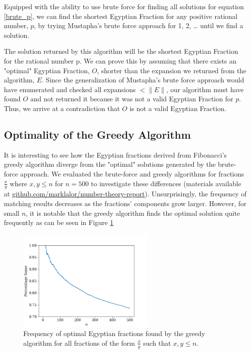 \documentclass[paper=a4, fontsize=11pt]{scrartcl}
\numberwithin{equation}{section}	 %
\numberwithin{figure}{section}	 %
\numberwithin{table}{section}	 %
\begin{document}
Equipped with the ability to use brute force for finding all solutions for equation \ref{brute_p}, we can find the shortest Egyptian Fraction for any positive rational number, $p$, by trying Mustapha’s brute force approach for 1, 2, … until we find a solution.

The solution returned by this algorithm will be the shortest Egyptian Fraction for the rational number p. We can prove this by assuming that there exists an "optimal" Egyptian Fraction, $O$, shorter than the expansion we returned from the algorithm, $E$. Since the generalization of Mustapha’s brute force approach would have enumerated and checked all expansions $< \|E\|$, our algorithm must have found $O$ and not returned it because it was not a valid Egyptian Fraction for $p$. Thus, we arrive at a contradiction that $O$ is not a valid Egyptian Fraction. 

\subsection{Optimality of the Greedy Algorithm}\label{sec:optimality}
It is interesting to see how the Egyptian fractions derived from Fibonacci’s greedy algorithm diverge from the "optimal" solutions generated by the brute-force approach. We evaluated the brute-force and greedy algorithms for fractions $\frac{x}{y}$ where $x,y \leq n$ for $n=500$ to investigate these differences (materials available at \href{https://github.com/marklalor/number-theory-report}{github.com/marklalor/number-theory-report}). Unsurprisingly, the frequency of matching results decreases as the fractions' components grow larger. However, for small $n$, it is notable that the greedy algorithm finds the optimal solution quite frequently as can be seen in Figure \ref{fig:n_freq}

\begin{figure}[t]
\centering
\includegraphics[width=0.60\textwidth]{n_percent_graph}
\caption{Frequency of optimal Egyptian fractions found by the greedy algorithm for all fractions of the form $\frac{x}{y}$ such that $x,y \leq n$.}
\label{fig:n_freq}
\end{figure}
\end{document}
